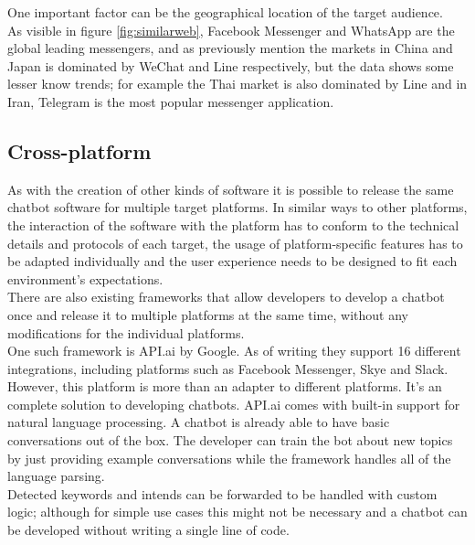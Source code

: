 One important factor can be the geographical location of the target audience.
\\
As visible in figure \ref{fig:similarweb}, Facebook Messenger and WhatsApp are the global leading messengers,
and as previously mention the markets in China and Japan is dominated by WeChat and Line respectively,
but the data shows some lesser know trends; for example the Thai market is also dominated by Line
and in Iran, Telegram is the most popular messenger application.


\subsection{Cross-platform}
\label{crossplatform}

As with the creation of other kinds of software it is possible to release the same chatbot software for multiple target platforms. In similar ways to other platforms, the interaction of the software with the platform has to conform to the technical details and protocols of each target, the usage of platform-specific features has to be adapted individually and the user experience needs to be designed to fit each environment's expectations.
\\

There are also existing frameworks that allow developers to develop a chatbot once and release it to multiple platforms at the same time, without any modifications for the individual platforms.
\\
One such framework is API.ai by Google. As of writing they support 16 different integrations, including platforms such as Facebook Messenger, Skye and Slack\cite{apiai}. However, this platform is more than an adapter to different platforms. It's an complete solution to developing chatbots. API.ai comes with built-in support for natural language processing. A chatbot is already able to have basic conversations out of the box. The developer can train the bot about new topics by just providing example conversations while the framework handles all of the language parsing.
\\
Detected keywords and intends can be forwarded to be handled with custom logic; although for simple use cases this might not be necessary and a chatbot can be developed without writing a single line of code.
\\


